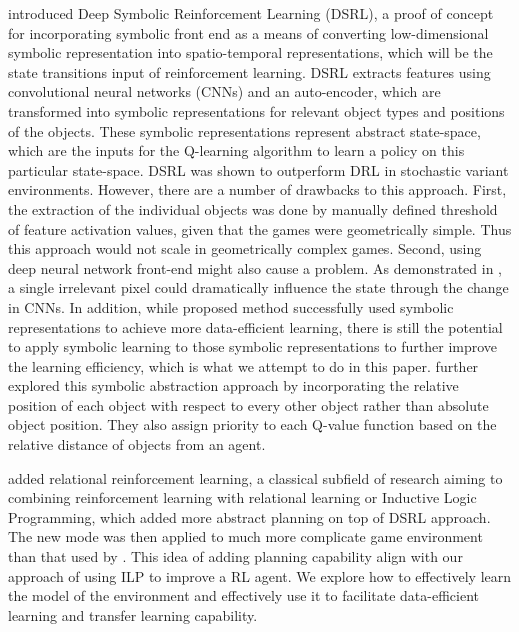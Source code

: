  \cite{Garnelo2016} introduced Deep Symbolic Reinforcement Learning (DSRL), a proof of concept for incorporating symbolic front end as a means of converting low-dimensional symbolic representation into spatio-temporal representations, which will be the state transitions input of reinforcement learning. 
 DSRL extracts features using convolutional neural networks (CNNs) \cite{LeCunL1998} and an auto-encoder, which are transformed into symbolic representations for relevant object types and positions of the objects. 
 These symbolic representations represent abstract state-space, which are the inputs for the Q-learning algorithm to learn a policy on this particular state-space. 
 DSRL was shown to outperform DRL in stochastic variant environments.
However, there are a number of drawbacks to this approach. 
First, the extraction of the individual objects was done by manually defined threshold of feature activation values, given that the games were geometrically simple. 
Thus this approach would not scale in geometrically complex games. 
Second, using deep neural network front-end might also cause a problem. As demonstrated in \cite{Su2017}, a single irrelevant pixel could dramatically influence the state through the change in CNNs.
In addition, while proposed method successfully used symbolic representations to achieve more data-efficient learning, 
there is still the potential to apply symbolic learning to those symbolic representations to further improve the learning efficiency, which is what we attempt to do in this paper.
\cite{Garcez2018} further explored this symbolic abstraction approach by incorporating the relative position of each object with respect to every other object rather than absolute object position. 
They also assign priority to each Q-value function based on the relative distance of objects from an agent.

\cite{Zambaldi2018} added relational reinforcement learning, a classical subfield of research aiming to combining reinforcement learning with relational learning or Inductive Logic Programming,  which added more abstract planning on top of DSRL approach. 
The new mode was then applied to much more complicate game environment than that used by \cite{Garnelo2016}.
This idea of adding planning capability align with our approach of using ILP to improve a RL agent. 
We explore how to effectively learn the model of the environment and effectively use it to facilitate data-efficient learning and transfer learning capability.

